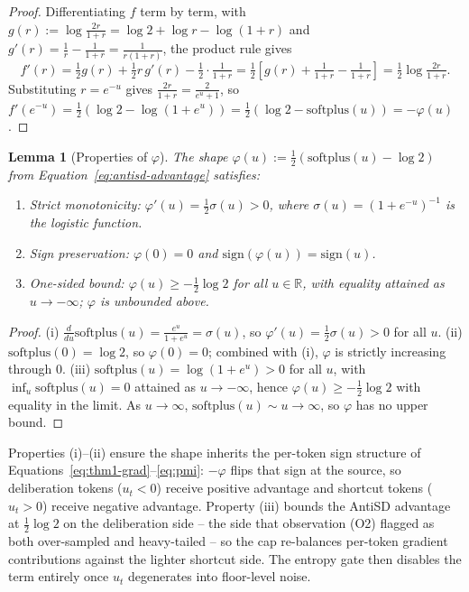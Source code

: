 \documentclass{article}
\newtheorem{lemma}[theorem]{Lemma}
\begin{document}
\begin{proof}
  Differentiating $f$ term by term, with $g(r) := \log\frac{2r}{1+r} = \log 2 + \log r - \log(1+r)$ and $g'(r) = \frac{1}{r} - \frac{1}{1+r} = \frac{1}{r(1+r)}$, the product rule gives
  \begin{equation*}
    f'(r) = \tfrac12 g(r) + \tfrac12 r\,g'(r) - \tfrac12 \cdot \tfrac{1}{1+r} = \tfrac12\!\left[g(r) + \tfrac{1}{1+r} - \tfrac{1}{1+r}\right] = \tfrac12 \log \tfrac{2r}{1+r}.
  \end{equation*}
  Substituting $r = e^{-u}$ gives $\frac{2r}{1+r} = \frac{2}{e^u+1}$, so $f'(e^{-u}) = \tfrac12(\log 2 - \log(1+e^u)) = \tfrac12(\log 2 - \mathrm{softplus}(u)) = -\varphi(u)$.
\end{proof}

\begin{lemma}[Properties of $\varphi$]
  \label{lem:phi-props}
  The shape $\varphi(u) := \tfrac12(\mathrm{softplus}(u) - \log 2)$ from Equation~\eqref{eq:antisd-advantage} satisfies:
  \begin{enumerate}
    \item[\textnormal{(i)}] \emph{Strict monotonicity:} $\varphi'(u) = \tfrac{1}{2}\sigma(u) > 0$, where $\sigma(u) = (1+e^{-u})^{-1}$ is the logistic function.
    \item[\textnormal{(ii)}] \emph{Sign preservation:} $\varphi(0) = 0$ and $\mathrm{sign}(\varphi(u)) = \mathrm{sign}(u)$.
    \item[\textnormal{(iii)}] \emph{One-sided bound:} $\varphi(u) \ge -\tfrac{1}{2}\log 2$ for all $u \in \mathbb{R}$, with equality attained as $u \to -\infty$; $\varphi$ is unbounded above.
  \end{enumerate}
\end{lemma}

\begin{proof}
  \textnormal{(i)} $\frac{d}{du}\mathrm{softplus}(u) = \frac{e^u}{1+e^u} = \sigma(u)$, so $\varphi'(u) = \tfrac12 \sigma(u) > 0$ for all $u$.
  \textnormal{(ii)} $\mathrm{softplus}(0) = \log 2$, so $\varphi(0) = 0$; combined with (i), $\varphi$ is strictly increasing through $0$.
  \textnormal{(iii)} $\mathrm{softplus}(u) = \log(1 + e^u) > 0$ for all $u$, with $\inf_u \mathrm{softplus}(u) = 0$ attained as $u \to -\infty$, hence $\varphi(u) \ge -\tfrac{1}{2}\log 2$ with equality in the limit. As $u \to \infty$, $\mathrm{softplus}(u) \sim u \to \infty$, so $\varphi$ has no upper bound.
\end{proof}

Properties (i)--(ii) ensure the shape inherits the per-token sign structure of Equations~\eqref{eq:thm1-grad}--\eqref{eq:pmi}: $-\varphi$ flips that sign at the source, so deliberation tokens ($u_t < 0$) receive positive advantage and shortcut tokens ($u_t > 0$) receive negative advantage. Property (iii) bounds the AntiSD advantage at $\tfrac12 \log 2$ on the deliberation side -- the side that observation (O2) flagged as both over-sampled and heavy-tailed -- so the cap re-balances per-token gradient contributions against the lighter shortcut side. The entropy gate then disables the term entirely once $u_t$ degenerates into floor-level noise.
\end{document}

